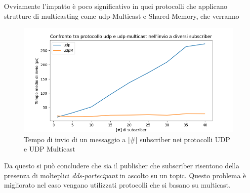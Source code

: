 Ovviamente l'impatto è poco significativo in quei protocolli che applicano strutture di multicasting come udp-Multicast e Shared-Memory, che verranno 

\begin{figure}[H]
        \includegraphics[width=\textwidth]{./results/test3_udpvsudpM.png} 
        \caption{Tempo di invio di un messaggio a [\#] subscriber nei protocolli UDP e UDP Multicast}\label{fig:udpvsudpMfigure}
\end{figure}

Da questo si può concludere che sia il publisher che subscriber risentono della presenza di molteplici \emph{dds-partecipant} in ascolto su un topic. Questo problema è migliorato nel caso vengano utilizzati protocolli che si basano su multicast. 

